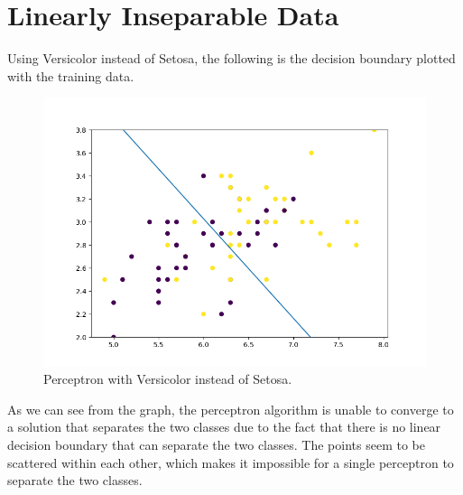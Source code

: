 \documentclass{article}
\begin{document}
\section{Linearly Inseparable Data}

Using Versicolor instead of Setosa, the following is the decision boundary plotted with the training data.

\begin{figure}[H]
  \centering
  \includegraphics[width=0.65\linewidth]{Figure_4.png}
  \caption{Perceptron with Versicolor instead of Setosa.}
\end{figure}

As we can see from the graph, the perceptron algorithm is unable to converge to a solution that separates the two classes due to the fact that there is no linear decision boundary that can separate the two classes.
The points seem to be scattered within each other, which makes it impossible for a single perceptron to separate the two classes.
\end{document}
